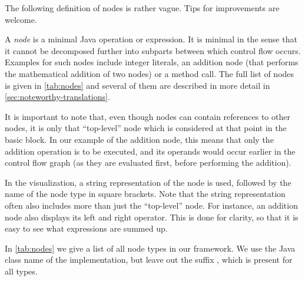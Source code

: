 \begin{workinprogress}
    The following definition of nodes is rather vague. Tips for improvements are welcome.
\end{workinprogress}
\begin{definition}[Nodes]
    \label{def:node}
    A \emph{node} is a minimal Java operation or expression.
    It is minimal in the sense that it cannot be decomposed further into subparts
    between which control flow occurs. Examples for such nodes include integer literals,
    an addition node (that performs the mathematical addition of two nodes) or a method call.
    The full list of nodes is given in \autoref{tab:nodes} and several of them
    are described in more detail in \autoref{sec:noteworthy-translations}.
    
    It is important to note that, even though nodes can contain references to other nodes,
    it is only that ``top-level'' node which is considered at that point in the basic
    block. In our example of the addition node, this means that only the addition operation
    is to be executed, and its operands would occur earlier in the control flow graph
    (as they are evaluated first, before performing the addition).
\end{definition}

In the visualization, a string representation of the node is used, followed by the name
of the node type in square brackets. Note that the string representation often also includes
more than just the ``top-level'' node. For instance, an addition node also displays its
left and right operator. This is done for clarity, so that it is easy to see what
expressions are summed up.

In \autoref{tab:nodes} we give a list of all node types in our framework. We use the
Java class name of the implementation, but leave out the suffix , which is present
for all types.

